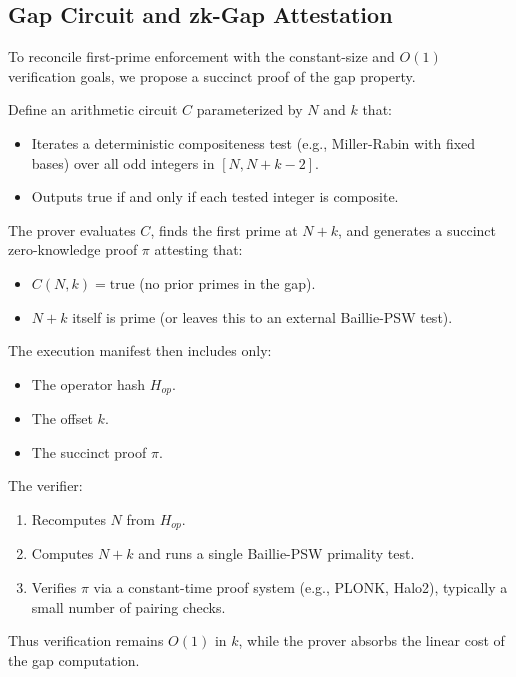 \documentclass[11pt]{article}
\begin{document}
\subsection{Gap Circuit and zk-Gap Attestation}

To reconcile first-prime enforcement with the constant-size and \( O(1) \) verification goals, we propose a succinct proof of the gap property.

Define an arithmetic circuit \( C \) parameterized by \( N \) and \( k \) that:
\begin{itemize}[leftmargin=*]
  \item Iterates a deterministic compositeness test (e.g., Miller-Rabin with fixed bases) over all odd integers in \( [N, N+k-2] \).
  \item Outputs true if and only if each tested integer is composite.
\end{itemize}

The prover evaluates \( C \), finds the first prime at \( N+k \), and generates a succinct zero-knowledge proof \( \pi \) attesting that:

\begin{itemize}[leftmargin=*]
  \item \( C(N,k) = \text{true} \) (no prior primes in the gap).
  \item \( N+k \) itself is prime (or leaves this to an external Baillie-PSW test).
\end{itemize}

The execution manifest then includes only:
\begin{itemize}[leftmargin=*]
  \item The operator hash \( H_{op} \).
  \item The offset \( k \).
  \item The succinct proof \( \pi \).
\end{itemize}

The verifier:
\begin{enumerate}[leftmargin=*]
  \item Recomputes \( N \) from \( H_{op} \).
  \item Computes \( N+k \) and runs a single Baillie-PSW primality test.
  \item Verifies \( \pi \) via a constant-time proof system (e.g., PLONK, Halo2), typically a small number of pairing checks.
\end{enumerate}

Thus verification remains \( O(1) \) in \( k \), while the prover absorbs the linear cost of the gap computation.
\end{document}
